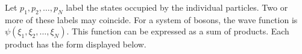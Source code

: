 Let $p_1,p_2,\ldots,p_N$ label the states occupied by the individual particles.
Two or more of these labels may coincide.
For a system of bosons, the wave function is $\psi(\xi_1,\xi_2,\ldots,\xi_N)$.
This function can be expressed as a sum of products.
Each product has the form displayed below.
